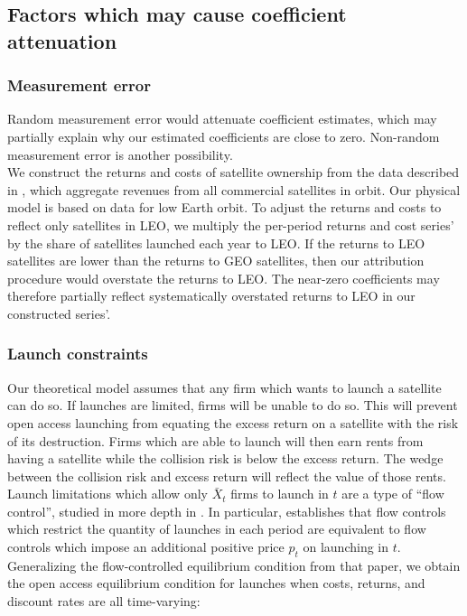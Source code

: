 \documentclass[12pt]{article}
\begin{document}
\subsection{Factors which may cause coefficient attenuation}
\label{attenuationFactors}
\subsubsection*{Measurement error}

Random measurement error would attenuate coefficient estimates, which may partially explain why our estimated coefficients are close to zero. Non-random measurement error is another possibility. \\

We construct the returns and costs of satellite ownership from the data described in \citet{wienzierl2018}, which aggregate revenues from all commercial satellites in orbit. Our physical model is based on data for low Earth orbit. To adjust the returns and costs to reflect only satellites in LEO, we multiply the per-period returns and cost series' by the share of satellites launched each year to LEO. If the returns to LEO satellites are lower than the returns to GEO satellites, then our attribution procedure would overstate the returns to LEO. The near-zero coefficients may therefore partially reflect systematically overstated returns to LEO in our constructed series'.

\subsubsection*{Launch constraints}

Our theoretical model assumes that any firm which wants to launch a satellite can do so. If launches are limited, firms will be unable to do so. This will prevent open access launching from equating the excess return on a satellite with the risk of its destruction. Firms which are able to launch will then earn rents from having a satellite while the collision risk is below the excess return. The wedge between the collision risk and excess return will reflect the value of those rents. \\

Launch limitations which allow only $\bar{X}_t$ firms to launch in $t$ are a type of ``flow control'', studied in more depth in \citet{raoJMP}. In particular, \citet{raoJMP} establishes that flow controls which restrict the quantity of launches in each period are equivalent to flow controls which impose an additional positive price $p_t$ on launching in $t$. Generalizing the flow-controlled equilibrium condition from that paper, we obtain the open access equilibrium condition for launches when costs, returns, and discount rates are all time-varying:
\end{document}
